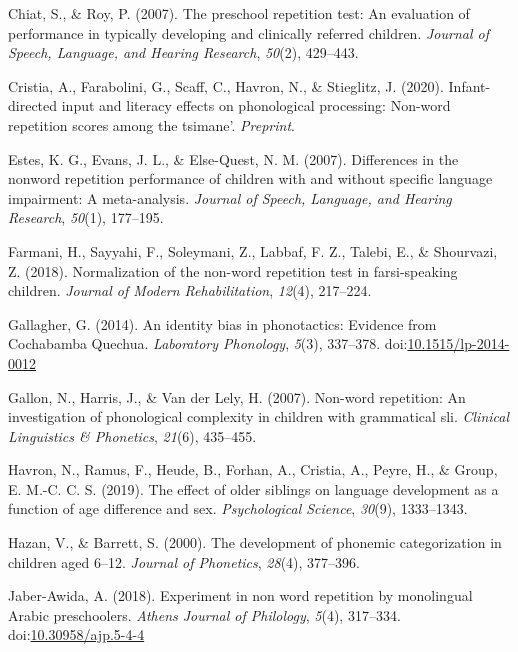 \documentclass[english,,man,floatsintext]{apa6}
\begin{document}
\hypertarget{ref-chiat2007preschool}{}
Chiat, S., \& Roy, P. (2007). The preschool repetition test: An
evaluation of performance in typically developing and clinically
referred children. \emph{Journal of Speech, Language, and Hearing
Research}, \emph{50}(2), 429--443.

\hypertarget{ref-cristia2020infant}{}
Cristia, A., Farabolini, G., Scaff, C., Havron, N., \& Stieglitz, J.
(2020). Infant-directed input and literacy effects on phonological
processing: Non-word repetition scores among the tsimane'.
\emph{Preprint}.

\hypertarget{ref-estes2007differences}{}
Estes, K. G., Evans, J. L., \& Else-Quest, N. M. (2007). Differences in
the nonword repetition performance of children with and without specific
language impairment: A meta-analysis. \emph{Journal of Speech, Language,
and Hearing Research}, \emph{50}(1), 177--195.

\hypertarget{ref-farmani2018normalization}{}
Farmani, H., Sayyahi, F., Soleymani, Z., Labbaf, F. Z., Talebi, E., \&
Shourvazi, Z. (2018). Normalization of the non-word repetition test in
farsi-speaking children. \emph{Journal of Modern Rehabilitation},
\emph{12}(4), 217--224.

\hypertarget{ref-gallagher2014identity}{}
Gallagher, G. (2014). An identity bias in phonotactics: Evidence from
Cochabamba Quechua. \emph{Laboratory Phonology}, \emph{5}(3), 337--378.
doi:\href{https://doi.org/10.1515/lp-2014-0012}{10.1515/lp-2014-0012}

\hypertarget{ref-gallon2007non}{}
Gallon, N., Harris, J., \& Van der Lely, H. (2007). Non-word repetition:
An investigation of phonological complexity in children with grammatical
sli. \emph{Clinical Linguistics \& Phonetics}, \emph{21}(6), 435--455.

\hypertarget{ref-havron2019effect}{}
Havron, N., Ramus, F., Heude, B., Forhan, A., Cristia, A., Peyre, H., \&
Group, E. M.-C. C. S. (2019). The effect of older siblings on language
development as a function of age difference and sex. \emph{Psychological
Science}, \emph{30}(9), 1333--1343.

\hypertarget{ref-hazan2000development}{}
Hazan, V., \& Barrett, S. (2000). The development of phonemic
categorization in children aged 6--12. \emph{Journal of Phonetics},
\emph{28}(4), 377--396.

\hypertarget{ref-jabere2018xperiment}{}
Jaber-Awida, A. (2018). Experiment in non word repetition by monolingual
Arabic preschoolers. \emph{Athens Journal of Philology}, \emph{5}(4),
317--334.
doi:\href{https://doi.org/10.30958/ajp.5-4-4}{10.30958/ajp.5-4-4}
\end{document}

